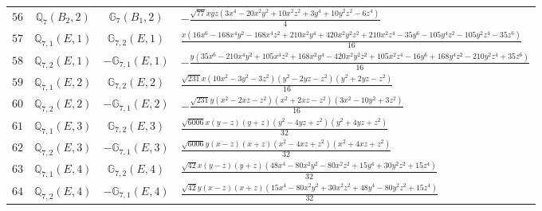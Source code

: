 \documentclass[fleqn,8pt,landscape]{jsarticle}
\begin{document}
\begin{table}[ht!]
\begin{center}
\begin{tabular}{cccl}
$ 56 $ & $ \mathbb{Q}_{7}(B_{2},2) $ & $ \mathbb{G}_{7}(B_{1},2) $ & $ - \frac{\sqrt{77} x y z \left(3 x^{4} - 20 x^{2} y^{2} + 10 x^{2} z^{2} + 3 y^{4} + 10 y^{2} z^{2} - 6 z^{4}\right)}{4} $ \\
$ 57 $ & $ \mathbb{Q}_{7,1}(E,1) $ & $ \mathbb{G}_{7,2}(E,1) $ & $ \frac{x \left(16 x^{6} - 168 x^{4} y^{2} - 168 x^{4} z^{2} + 210 x^{2} y^{4} + 420 x^{2} y^{2} z^{2} + 210 x^{2} z^{4} - 35 y^{6} - 105 y^{4} z^{2} - 105 y^{2} z^{4} - 35 z^{6}\right)}{16} $ \\
$ 58 $ & $ \mathbb{Q}_{7,2}(E,1) $ & $ -\mathbb{G}_{7,1}(E,1) $ & $ - \frac{y \left(35 x^{6} - 210 x^{4} y^{2} + 105 x^{4} z^{2} + 168 x^{2} y^{4} - 420 x^{2} y^{2} z^{2} + 105 x^{2} z^{4} - 16 y^{6} + 168 y^{4} z^{2} - 210 y^{2} z^{4} + 35 z^{6}\right)}{16} $ \\
$ 59 $ & $ \mathbb{Q}_{7,1}(E,2) $ & $ \mathbb{G}_{7,2}(E,2) $ & $ \frac{\sqrt{231} x \left(10 x^{2} - 3 y^{2} - 3 z^{2}\right) \left(y^{2} - 2 y z - z^{2}\right) \left(y^{2} + 2 y z - z^{2}\right)}{16} $ \\
$ 60 $ & $ \mathbb{Q}_{7,2}(E,2) $ & $ -\mathbb{G}_{7,1}(E,2) $ & $ - \frac{\sqrt{231} y \left(x^{2} - 2 x z - z^{2}\right) \left(x^{2} + 2 x z - z^{2}\right) \left(3 x^{2} - 10 y^{2} + 3 z^{2}\right)}{16} $ \\
$ 61 $ & $ \mathbb{Q}_{7,1}(E,3) $ & $ \mathbb{G}_{7,2}(E,3) $ & $ \frac{\sqrt{6006} x \left(y - z\right) \left(y + z\right) \left(y^{2} - 4 y z + z^{2}\right) \left(y^{2} + 4 y z + z^{2}\right)}{32} $ \\
$ 62 $ & $ \mathbb{Q}_{7,2}(E,3) $ & $ -\mathbb{G}_{7,1}(E,3) $ & $ \frac{\sqrt{6006} y \left(x - z\right) \left(x + z\right) \left(x^{2} - 4 x z + z^{2}\right) \left(x^{2} + 4 x z + z^{2}\right)}{32} $ \\
$ 63 $ & $ \mathbb{Q}_{7,1}(E,4) $ & $ \mathbb{G}_{7,2}(E,4) $ & $ \frac{\sqrt{42} x \left(y - z\right) \left(y + z\right) \left(48 x^{4} - 80 x^{2} y^{2} - 80 x^{2} z^{2} + 15 y^{4} + 30 y^{2} z^{2} + 15 z^{4}\right)}{32} $ \\
$ 64 $ & $ \mathbb{Q}_{7,2}(E,4) $ & $ -\mathbb{G}_{7,1}(E,4) $ & $ \frac{\sqrt{42} y \left(x - z\right) \left(x + z\right) \left(15 x^{4} - 80 x^{2} y^{2} + 30 x^{2} z^{2} + 48 y^{4} - 80 y^{2} z^{2} + 15 z^{4}\right)}{32} $ \\
 \hline \hline
\end{tabular}
\end{center}
\end{table}
\end{document}
